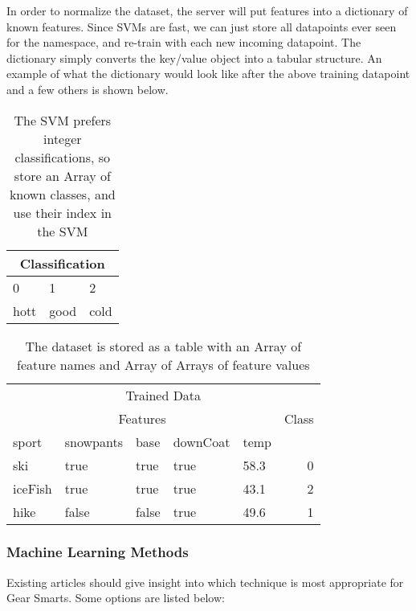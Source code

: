 In order to normalize the dataset, the server will put features into a dictionary of known features. Since SVMs are
fast, we can just store all datapoints ever seen for the namespace, and re-train with each new incoming datapoint.
The dictionary simply converts the key/value object into a tabular structure. An example of what the dictionary would
look like after the above training datapoint and a few others is shown below.

\begin{table}
\label{table:classifications}
    \begin{tabular}{lll}
        \hline
        \multicolumn{3}{c}{Classification} \\
        \hline
        0 & 1 & 2 \\
        hott & good & cold \\
        \hline
    \end{tabular}
    \caption{The SVM prefers integer classifications, so store an Array of known classes, and use their index in the SVM}
\end{table}

\begin{table}
\label{table:dictionary}
    \begin{tabular}{lllllr}
        \hline
        \multicolumn{6}{c}{Trained Data} \\
        \multicolumn{5}{c}{Features} & Class \\
        \hline
        sport   & snowpants & base  & downCoat & temp   \\
        \hline
        \hline
        ski     & true      & true  & true      & 58.3  & 0 \\
        iceFish & true      & true  & true      & 43.1  & 2 \\
        hike    & false     & false & true      & 49.6  & 1 \\
        \hline
    \end{tabular}
    \caption{The dataset is stored as a table with an Array of feature names and Array of Arrays of feature values}
\end{table}


\subsubsection{Machine Learning Methods}
\label{section:mloptions}
Existing articles should give insight into which technique is
most appropriate for Gear Smarts. Some options are listed below:

